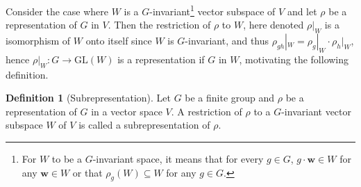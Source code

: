 \documentclass[12pt, a4paper, twoside]{article}
\theoremstyle{definition}
\newtheorem{definition}{Definition}[section]
\theoremstyle{remark}
\numberwithin{equation}{section}
\newcommand{\1}{\mathbf{1}}
\newcommand{\0}{\mathbf{0}}
\newcommand{\GL}{\text{GL}}
\newcommand{\wvec}{\mathbf{w}}
\begin{document}
	
	
	
	
	
	Consider the case where $W$ is a $G$-invariant\footnote{For $W$ to be a $G$-invariant space, it means that for every $g \in G$, $g \cdot \wvec \in W$ for any $\wvec \in W$ or that $\rho_g(W) \subseteq W$ for any $g\in G$.} vector subspace of $V$%
	and let $\rho$ be a representation of $G$ in $V$. Then the restriction of $\rho$ to $W$, here denoted $\rho|_W$ is a isomorphism of $W$ onto itself since $W$ is $G$-invariant, and thus $\rho_{gh}|_W = \rho_g|_W \cdot \rho_h|_W$, hence $\rho|_W: G \rightarrow \GL(W)$ is a representation if $G$ in $W$, motivating the following definition.
	
	\begin{definition}[Subrepresentation]\label{def:subrepr}
		Let $G$ be a finite group and $\rho$ be a representation of $G$ in a vector space $V$. A restriction of $\rho$ to a $G$-invariant vector subspace $W$ of $V$ is called a subrepresentation of $\rho$.
	\end{definition}
	
\end{document}
